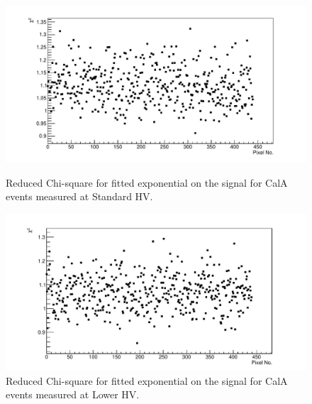 \begin{figure}%
\includegraphics[width=\textwidth]{chapters/graphs/GainVarsMeas/LL_m04_2016-06-11/Set0and2/Chi2_AverageMethod_Signal_StandHV.pdf}
\caption{Reduced Chi-square for fitted exponential on the signal for CalA events measured at Standard HV.}\label{fig:Chi2VsPixel_Signal_StandHV_Average}
\vspace{3mm}
\includegraphics[width=\textwidth]{chapters/graphs/GainVarsMeas/LL_m04_2016-06-11/Set0and2/Chi2_AverageMethod_Signal_LowHV.pdf}
\caption{Reduced Chi-square for fitted exponential on the signal for CalA events measured at Lower HV.}\label{fig:Chi2VsPixel_Signal_LowerHV_Average}
\end{figure}

